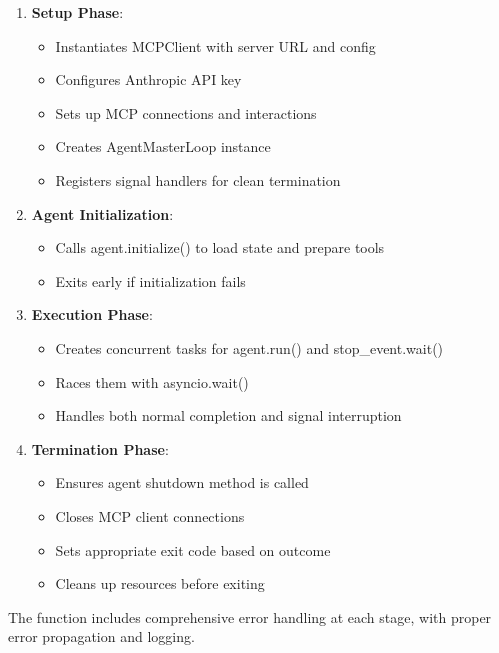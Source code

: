 \documentclass[12pt,a4paper]{article}
\begin{document}
\begin{enumerate}[label=\arabic*.]
    \item \textbf{Setup Phase}:
    \begin{itemize}
        \item Instantiates MCPClient with server URL and config
        \item Configures Anthropic API key
        \item Sets up MCP connections and interactions
        \item Creates AgentMasterLoop instance
        \item Registers signal handlers for clean termination
    \end{itemize}
    \item \textbf{Agent Initialization}:
    \begin{itemize}
        \item Calls agent.initialize() to load state and prepare tools
        \item Exits early if initialization fails
    \end{itemize}
    \item \textbf{Execution Phase}:
    \begin{itemize}
        \item Creates concurrent tasks for agent.run() and stop\_event.wait()
        \item Races them with asyncio.wait()
        \item Handles both normal completion and signal interruption
    \end{itemize}
    \item \textbf{Termination Phase}:
    \begin{itemize}
        \item Ensures agent shutdown method is called
        \item Closes MCP client connections
        \item Sets appropriate exit code based on outcome
        \item Cleans up resources before exiting
    \end{itemize}
\end{enumerate}

The function includes comprehensive error handling at each stage, with proper error propagation and logging.
\end{document}
